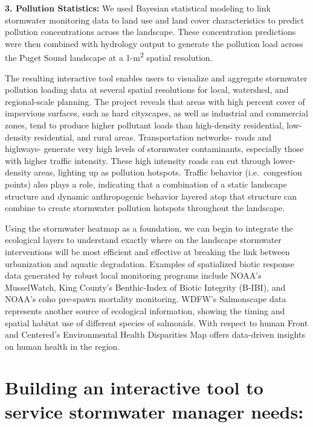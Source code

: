 \documentclass[
]{report}
\begin{document}
\textbf{3. Pollution Statistics:} We used Bayesian statistical modeling to link stormwater monitoring data to land use and land cover characteristics to predict pollution concentrations across the landscape. These concentration predictions were then combined with hydrology output to generate the pollution load across the Puget Sound landscape at a 1-m\textsuperscript{2} spatial resolution.

The resulting interactive tool enables users to visualize and aggregate stormwater pollution loading data at several spatial resolutions for local, watershed, and regional-scale planning. The project reveals that areas with high percent cover of impervious surfaces, such as hard cityscapes, as well as industrial and commercial zones, tend to produce higher pollutant loads than high-density residential, low-density residential, and rural areas. Transportation networks- roads and highways- generate very high levels of stormwater contaminants, especially those with higher traffic intensity. These high intensity roads can cut through lower-density areas, lighting up as pollution hotspots. Traffic behavior (i.e.~congestion points) also plays a role, indicating that a combination of a static landscape structure and dynamic anthropogenic behavior layered atop that structure can combine to create stormwater pollution hotspots throughout the landscape.

Using the stormwater heatmap as a foundation, we can begin to integrate the ecological layers to understand exactly where on the landscape stormwater interventions will be most efficient and effective at breaking the link between urbanization and aquatic degradation. Examples of spatialized biotic response data generated by robust local monitoring programs include NOAA's MusselWatch, King County's Benthic-Index of Biotic Integrity (B-IBI), and NOAA's coho pre-spawn mortality monitoring. WDFW's Salmonscape data represents another source of ecological information, showing the timing and spatial habitat use of different species of salmonids. With respect to human Front and Centered's Environmental Health Disparities Map offers data-driven insights on human health in the region.

\hypertarget{building-an-interactive-tool-to-service-stormwater-manager-needs}{%
\section{Building an interactive tool to service stormwater manager needs:}\label{building-an-interactive-tool-to-service-stormwater-manager-needs}}
\end{document}
